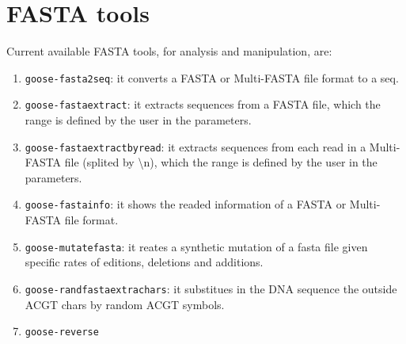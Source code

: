 \chapter{FASTA tools}
\label{fasta}

Current available FASTA tools, for analysis and manipulation, are:
\begin{enumerate}
\item \texttt{goose-fasta2seq}: it converts a FASTA or Multi-FASTA file format to a seq.
\item \texttt{goose-fastaextract}: it extracts sequences from a FASTA file, which the range is defined by the user in the parameters.
\item \texttt{goose-fastaextractbyread}: it extracts sequences from each read in a Multi-FASTA file (splited by \textbackslash n), which the range is defined by the user in the parameters.
\item \texttt{goose-fastainfo}: it shows the readed information of a FASTA or Multi-FASTA file format.
\item \texttt{goose-mutatefasta}: it reates a synthetic mutation of a fasta file given specific rates of editions, deletions and additions.
\item \texttt{goose-randfastaextrachars}: it substitues in the DNA sequence the outside ACGT chars by random ACGT symbols.
\item \texttt{goose-reverse}%

\end{enumerate}




 


%

